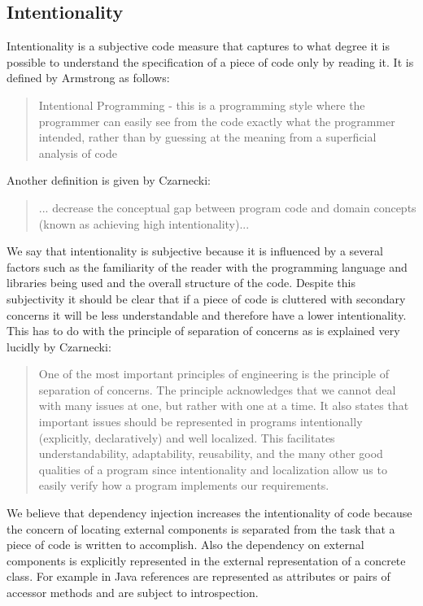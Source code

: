 \subsection{Intentionality}

Intentionality is a subjective code measure that captures to what degree it is possible to understand the specification
of a piece of code only by reading it. It is defined by Armstrong as follows:

\begin{quotation}
Intentional Programming - this is a programming style where the programmer can easily see from the code exactly
what the programmer intended, rather than by guessing at the meaning from a superficial analysis of code
\end{quotation}


Another definition is given by Czarnecki:

\begin{quotation}
... decrease the conceptual gap between program code and domain concepts (known as achieving high intentionality)...
\end{quotation}

We say that intentionality is subjective because it is influenced by a several factors such as the familiarity of
the reader with the programming language and libraries being used and the overall structure of the code. Despite
this subjectivity it should be clear that if a piece of code is cluttered with secondary concerns it will be
less understandable and therefore have a lower intentionality. This has to do with the principle of separation of
concerns as is explained very lucidly by Czarnecki:

\begin{quotation}
One of the most important principles of engineering is the principle of separation of concerns.
The principle acknowledges that we cannot deal with many issues at one, but rather with one at a
time. It also states that important issues should be represented in programs intentionally (explicitly, declaratively)
and well localized. This facilitates understandability, adaptability, reusability, and the many other good qualities 
of a program since intentionality and localization allow us to easily verify how a program implements our requirements.
\end{quotation}

We believe that dependency injection increases the intentionality of code because the concern of locating external components
is separated from the task that a piece of code is written to accomplish. Also the dependency on external components is explicitly
represented in the external representation of a concrete class. For example in Java references are represented as attributes or
pairs of accessor methods and are subject to introspection.

